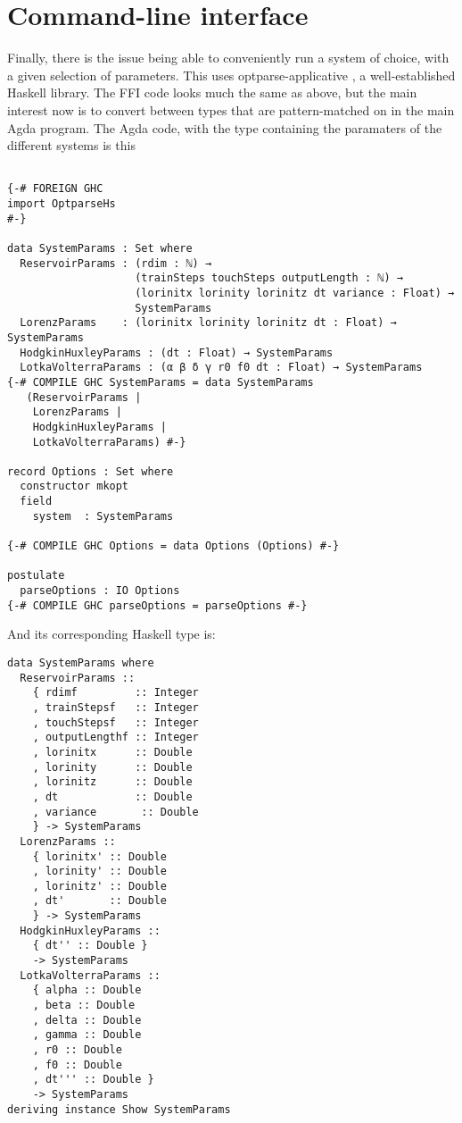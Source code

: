 \section{Command-line interface}
Finally, there is the issue being able to conveniently run a system of choice, with a given selection of parameters. This uses optparse-applicative \cite{optparse-applicative}, a well-established Haskell library. The FFI code looks much the same as above, but the main interest now is to convert between types that are pattern-matched on in the main Agda program. The Agda code, with the type containing the paramaters of the different systems is this
\begin{verbatim}

{-# FOREIGN GHC 
import OptparseHs
#-}

data SystemParams : Set where
  ReservoirParams : (rdim : ℕ) → 
                    (trainSteps touchSteps outputLength : ℕ) → 
                    (lorinitx lorinity lorinitz dt variance : Float) → 
                    SystemParams
  LorenzParams    : (lorinitx lorinity lorinitz dt : Float) → SystemParams
  HodgkinHuxleyParams : (dt : Float) → SystemParams
  LotkaVolterraParams : (α β δ γ r0 f0 dt : Float) → SystemParams
{-# COMPILE GHC SystemParams = data SystemParams
   (ReservoirParams | 
    LorenzParams | 
    HodgkinHuxleyParams | 
    LotkaVolterraParams) #-}

record Options : Set where
  constructor mkopt
  field
    system  : SystemParams

{-# COMPILE GHC Options = data Options (Options) #-}

postulate 
  parseOptions : IO Options
{-# COMPILE GHC parseOptions = parseOptions #-} 
\end{verbatim}

And its corresponding Haskell type is:

\begin{verbatim}
data SystemParams where
  ReservoirParams :: 
    { rdimf         :: Integer
    , trainStepsf   :: Integer
    , touchStepsf   :: Integer
    , outputLengthf :: Integer
    , lorinitx      :: Double
    , lorinity      :: Double
    , lorinitz      :: Double
    , dt            :: Double
    , variance       :: Double
    } -> SystemParams
  LorenzParams ::
    { lorinitx' :: Double
    , lorinity' :: Double
    , lorinitz' :: Double
    , dt'       :: Double
    } -> SystemParams
  HodgkinHuxleyParams ::
    { dt'' :: Double }
    -> SystemParams
  LotkaVolterraParams ::
    { alpha :: Double
    , beta :: Double
    , delta :: Double
    , gamma :: Double
    , r0 :: Double
    , f0 :: Double
    , dt''' :: Double }
    -> SystemParams
deriving instance Show SystemParams
\end{verbatim}

